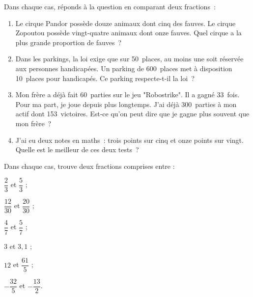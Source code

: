 \begin{exercice}
Dans chaque cas, réponds à la question en comparant deux fractions :
\begin{enumerate}
 \item Le cirque Pandor possède douze animaux dont cinq des fauves. Le cirque Zopoutou possède vingt-quatre animaux dont onze fauves. Quel cirque a la plus grande proportion de fauves ?
 \item Dans les parkings, la loi exige que sur 50 places, au moins une soit réservée aux personnes handicapées. Un parking de 600 places met à disposition 10 places pour handicapés. Ce parking respecte-t-il la loi ?
 \item Mon frère a déjà fait 60 parties sur le jeu "Robostrike". Il a gagné 33 fois. Pour ma part, je joue depuis plus longtemps. J'ai déjà 300 parties à mon actif dont 153 victoires. Est-ce qu'on peut dire que je gagne plus souvent que mon frère ?
 \item J'ai eu deux notes en maths : trois points sur cinq et onze points sur vingt. Quelle est le meilleur de ces deux tests ? 
 \end{enumerate}
\end{exercice}


\begin{exercice}[Intercaler]
Dans chaque cas, trouve deux fractions comprises entre :
\begin{colenumerate}{3}
 \item $\dfrac{2}{3}$ et $\dfrac{5}{3}$ ; 
 \vspace{0.2cm}
 \item $\dfrac{12}{30}$ et $\dfrac{20}{30}$ ; 
 \item $\dfrac{4}{7}$ et $\dfrac{5}{7}$ ; 
 \item $3$ et $3,1$ ; 
 \item $12$ et $\dfrac{61}{5}$ ; 
 \item $- \dfrac{32}{5}$ et $- \dfrac{13}{2}$.
 \end{colenumerate}
\end{exercice}



